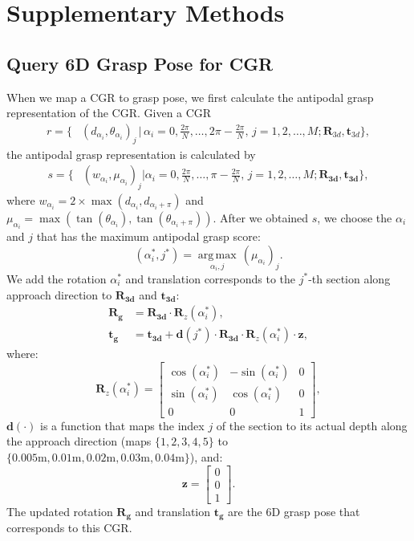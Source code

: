 \section*{\Large \textbf{Supplementary Methods}}

\subsection*{Query 6D Grasp Pose for CGR }
When we map a CGR to grasp pose, we first calculate the antipodal grasp representation of the CGR. Given a CGR
\begin{align}
r = \bigg\{ & (d_{\alpha_i}, \theta_{\alpha_i})_j \, \bigg| \, \alpha_i = 0, \frac{2\pi}{N}, \ldots, 2\pi-\frac{2\pi}{N}, \, j = 1, 2, \ldots, M; \mathbf{R}_{3d},\mathbf{t}_{3d} \bigg\},
\end{align}
the antipodal grasp representation is calculated by
\begin{align}
\nonumber s = \bigg\{ & (w_{\alpha_i}, \mu_{\alpha_i})_j  \bigg|  \alpha_i = 0, \frac{2\pi}{N}, \ldots, \pi-\frac{2\pi}{N}, \, j = 1, 2, \ldots, M;  \mathbf{R_{3d}}, \mathbf{t_{3d}} \bigg\},
\label{grasprep_sup}
\end{align}  
where  $w_{\alpha_i} = 2\times\max(d_{\alpha_i}, d_{\alpha_i+\pi})$ and  $\mu_{\alpha_i} = \max(\tan(\theta_{\alpha_i}), \tan(\theta_{\alpha_i+\pi}))$. After we obtained $s$, we choose the $\alpha_i$ and $j$ that has the maximum antipodal grasp score:
\[
(\alpha_i^*, j^*) = \underset{\alpha_i, j}{\operatorname{arg\,max}} \, (\mu_{\alpha_i})_j.
\]
We add the rotation $\alpha_i^*$ and translation corresponds to the $j^*$-th section along approach direction to $\mathbf{R_{3d}}$ and $\mathbf{t_{3d}}$:
\begin{align}
\nonumber \mathbf{R_{g}} &= \mathbf{R_{3d}} \cdot \mathbf{R}_z(\alpha_i^*),\\
\nonumber \mathbf{t_{g}} &= \mathbf{t_{3d}} + \mathbf{d}(j^*) \cdot \mathbf{R_{3d}} \cdot \mathbf{R}_z(\alpha_i^*) \cdot \mathbf{z},
\end{align}
where:
\[
\mathbf{R}_z(\alpha_i^*) = \begin{bmatrix} \cos(\alpha_i^*) & -\sin(\alpha_i^*) & 0 \\ \sin(\alpha_i^*) & \cos(\alpha_i^*) & 0 \\ 0 & 0 & 1 \end{bmatrix}, 
\]
$\mathbf{d}(\cdot)$ is a function that maps the index $j$ of the section to its actual depth along the approach direction (maps $\{1,2,3,4,5\}$ to $\{0.005\text{m}, 0.01\text{m}, 0.02\text{m}, 0.03\text{m}, 0.04\text{m}\}$), and:
\[
\mathbf{z} = \begin{bmatrix} 0 \\ 0 \\ 1 \end{bmatrix}.
\]
The updated rotation $\mathbf{R_{g}}$ and translation $\mathbf{t_{g}}$ are the 6D grasp pose that corresponds to this CGR. 

